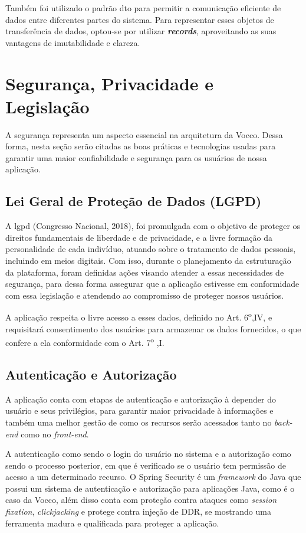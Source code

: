 Também foi utilizado o padrão \ac{dto} para permitir a comunicação eficiente de dados entre diferentes partes do sistema. Para representar esses objetos de transferência de dados, optou-se por utilizar \textit{\textbf{records}}, aproveitando as suas vantagens de imutabilidade e clareza.

\section{Segurança, Privacidade e Legislação}
A segurança representa um aspecto essencial na arquitetura da Vocco. Dessa forma, nesta seção serão citadas as boas práticas e tecnologias usadas para garantir uma maior confiabilidade e segurança para os usuários de nossa aplicação.

\subsection{Lei Geral de Proteção de Dados (LGPD)}
A \ac{lgpd} (Congresso Nacional, 2018), foi promulgada com o objetivo de proteger os direitos fundamentais de liberdade e de privacidade, e a livre formação da personalidade de cada indivíduo, atuando sobre o tratamento de dados pessoais, incluindo em meios digitais.
Com isso, durante o planejamento da estruturação da plataforma, foram definidas ações visando atender a essas necessidades de segurança, para dessa forma assegurar que a aplicação estivesse em conformidade com essa legislação e atendendo ao compromisso de proteger nossos usuários.

A aplicação respeita o livre acesso a esses dados, definido no Art. 6\textsuperscript{o},IV, e requisitará consentimento dos usuários para armazenar os dados fornecidos, o que confere a ela conformidade com o Art. 7\textsuperscript{o}
,I.


\subsection{Autenticação e Autorização}
A aplicação conta com etapas de autenticação e autorização à depender do usuário e seus privilégios, para garantir maior privacidade à informações e também uma melhor gestão de como os recursos serão acessados tanto no \textit{back-end} como no \textit{front-end}.

A autenticação como sendo o login do usuário no sistema e a autorização como sendo o processo posterior, em que é verificado se o usuário tem permissão de acesso a um determinado recurso.
O Spring Security é um \textit{framework} do Java que possui um sistema  de autenticação e autorização para aplicações Java, como é o caso da Vocco, além disso conta com proteção contra ataques como \textit{session fixation}, \textit{clickjacking} e protege contra injeção de DDR, se mostrando uma ferramenta madura e qualificada para proteger a aplicação.

